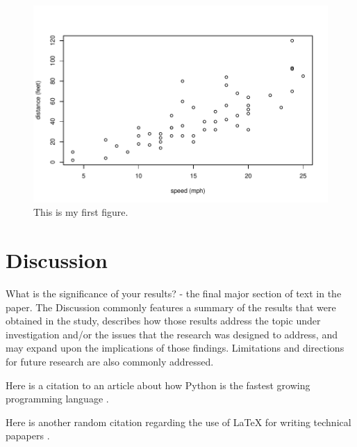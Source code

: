 \documentclass[12pt]{article}
\begin{document}
\begin{figure}
  \centering
  \includegraphics[width=\textwidth]{cars.pdf}
  \caption{This is my first figure.}
  \label{fig:cars}
\end{figure}

\section*{Discussion}
\label{sec:disc}

What is the significance of your results? - the final major section of text in the paper.  The Discussion commonly features a summary of the results that were obtained in the study, describes how those results address the topic under investigation and/or the issues that the research was designed to address, and may expand upon the implications of those findings.  Limitations and directions for future research are also commonly addressed.

Here is a citation to an article about how Python is the fastest growing programming language \citep{srinath2017python}.

Here is another random citation regarding the use of LaTeX for writing technical papapers \citet{baramidze2013latex}.

\lipsum[1-2]



\end{document}

